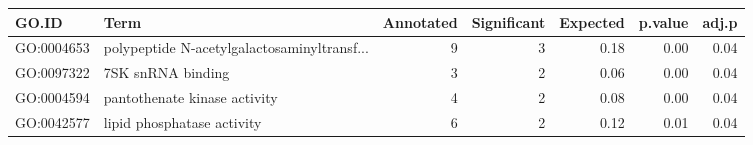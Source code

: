 \begin{table}[ht]
\centering
\begin{tabular}{llrrrrr}
  \hline
GO.ID & Term & Annotated & Significant & Expected & p.value & adj.p \\ 
  \hline
GO:0004653 & polypeptide N-acetylgalactosaminyltransf... &   9 &   3 & 0.18 & 0.00 & 0.04 \\ 
  GO:0097322 & 7SK snRNA binding &   3 &   2 & 0.06 & 0.00 & 0.04 \\ 
  GO:0004594 & pantothenate kinase activity &   4 &   2 & 0.08 & 0.00 & 0.04 \\ 
  GO:0042577 & lipid phosphatase activity &   6 &   2 & 0.12 & 0.01 & 0.04 \\ 
   \hline
\end{tabular}
\end{table}
